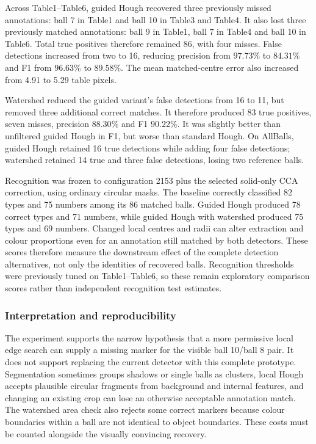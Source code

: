 


Across Table1--Table6, guided Hough recovered three previously missed
annotations: ball 7 in Table1 and ball 10 in Table3 and Table4. It
also lost three previously matched annotations: ball 9 in Table1,
ball 7 in Table4 and ball 10 in Table6. Total true positives therefore
remained 86, with four misses. False detections increased from two
to 16, reducing precision from $97.73\%$ to $84.31\%$ and F1 from
$96.63\%$ to $89.58\%$. The mean matched-centre error also increased
from 4.91 to 5.29 table pixels.

Watershed reduced the guided variant's false detections from 16 to 11,
but removed three additional correct matches. It therefore produced
83 true positives, seven misses, precision $88.30\%$ and F1 $90.22\%$.
It was slightly better than unfiltered guided Hough in F1, but worse
than standard Hough. On AllBalls, guided Hough retained 16 true
detections while adding four false detections; watershed retained
14 true and three false detections, losing two reference balls.



Recognition was frozen to configuration 2153 plus the selected solid-only
CCA correction, using ordinary circular masks. The baseline correctly
classified 82 types and 75 numbers among its 86 matched balls. Guided
Hough produced 78 correct types and 71 numbers, while guided Hough
with watershed produced 75 types and 69 numbers. Changed local centres
and radii can alter extraction and colour proportions even for an
annotation still matched by both detectors. These scores therefore
measure the downstream effect of the complete detection alternatives,
not only the identities of recovered balls. Recognition thresholds
were previously tuned on Table1--Table6, so these remain exploratory
comparison scores rather than independent recognition test estimates.

\subsubsection{Interpretation and reproducibility}

The experiment supports the narrow hypothesis that a more permissive
local edge search can supply a missing marker for the visible ball
10/ball 8 pair. It does not support replacing the current detector
with this complete prototype. Segmentation sometimes groups shadows
or single balls as clusters, local Hough accepts plausible circular
fragments from background and internal features, and changing an
existing crop can lose an otherwise acceptable annotation match.
The watershed area check also rejects some correct markers because
colour boundaries within a ball are not identical to object boundaries.
These costs must be counted alongside the visually convincing recovery.

